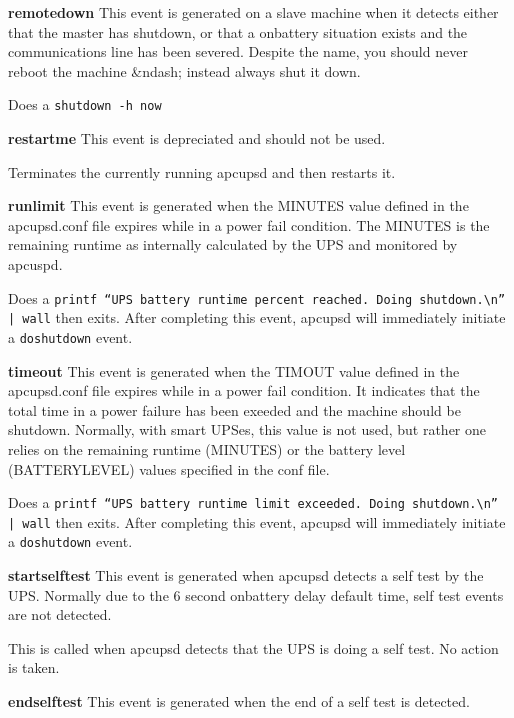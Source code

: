 \begin{description}
\item {\bf remotedown}
This event is generated on a slave machine when it detects either that the
master has shutdown, or that a onbattery situation exists and the
communications line has been severed. Despite the name, you should never
reboot the machine \&ndash; instead always shut it down.  

Does a {\tt shutdown -h now}  

\item {\bf restartme}
This event is depreciated and should not be used.  

Terminates the currently running apcupsd and then restarts it.  

\item {\bf runlimit}
This event is generated when the MINUTES value defined in the apcupsd.conf
file expires while in a power fail condition. The MINUTES is the remaining
runtime as internally calculated by the UPS and monitored by apcuspd.  

Does a {\tt printf ``UPS battery runtime percent reached. Doing
shutdown.\textbackslash{}n'' | wall} then exits.  After completing this event,
apcupsd will immediately initiate a {\tt doshutdown} event.  

\item {\bf timeout}
This event is generated when the TIMOUT value defined in the apcupsd.conf file
expires while in a power fail condition. It indicates that the total time in a
power failure has been exeeded and the machine should be shutdown. Normally,
with smart UPSes, this value is not used, but rather one relies on the
remaining runtime (MINUTES) or the battery level (BATTERYLEVEL) values
specified in the conf file.  

Does a {\tt printf ``UPS battery runtime limit exceeded. Doing
shutdown.\textbackslash{}n'' | wall} then exits. After completing this event,
apcupsd will immediately initiate a {\tt doshutdown} event.  

\item {\bf startselftest}
This event is generated when apcupsd detects a self test by the UPS. Normally
due to the 6 second onbattery delay default time, self test events are not
detected.  

This is called when apcupsd detects that the UPS is doing a self test. No
action is taken.  

\item {\bf endselftest}
This event is generated when the end of a self test is detected.  


\end{description}
